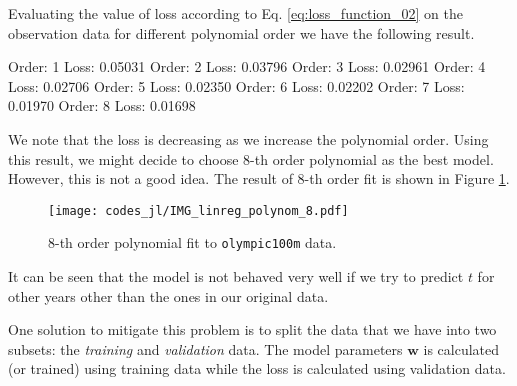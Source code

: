 \documentclass[b5paper,12pt]{article} %
\newcommand{\txtinline}[1]{\texttt{#1}}
\begin{document}
Evaluating the value of loss according to Eq. \eqref{eq:loss_function_02}
on the observation data for different polynomial order
we have the following result.
\begin{textcode}
Order:   1 Loss:    0.05031
Order:   2 Loss:    0.03796
Order:   3 Loss:    0.02961
Order:   4 Loss:    0.02706
Order:   5 Loss:    0.02350
Order:   6 Loss:    0.02202
Order:   7 Loss:    0.01970
Order:   8 Loss:    0.01698    
\end{textcode}
We note that the loss is decreasing as we increase the polynomial order.
Using this result, we might decide to choose 8-th order polynomial as the
best model. However, this is not a good idea.
The result of 8-th order fit is shown in Figure \ref{fig:8th_order_fit}.
\begin{figure}[H]
\begin{center}
\texttt{[image: codes\_jl/IMG\_linreg\_polynom\_8.pdf]}
\end{center}
\caption{8-th order polynomial fit to \txtinline{olympic100m} data.}
\label{fig:8th_order_fit}
\end{figure}
It can be seen that the model is not behaved very well if we try to predict
$t$ for other years other than the ones in our original data.

One solution to mitigate this problem is to split the data that we have
into two subsets: the \emph{training} and \emph{validation} data.
The model parameters $\mathbf{w}$ is calculated (or trained) using
training data while the loss is calculated using validation data.
\end{document}
